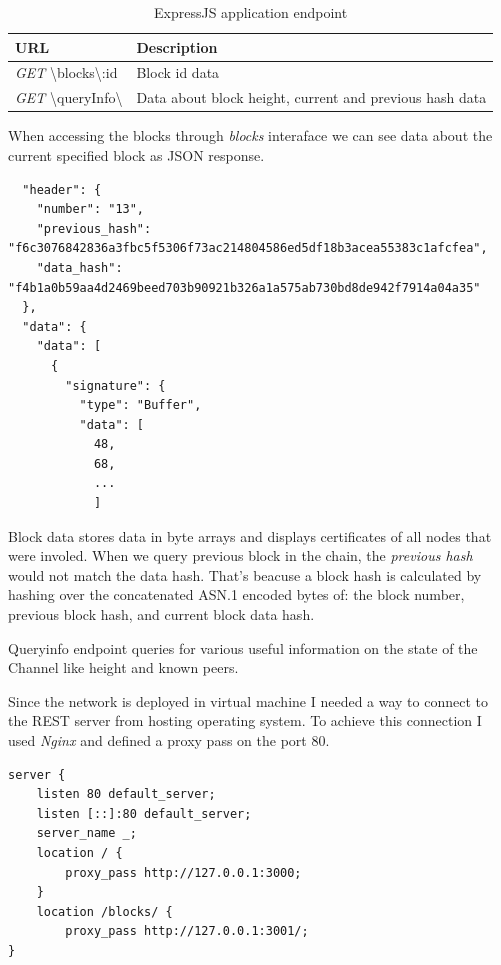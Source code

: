 \begin{table}[H]
\centering
\caption{ExpressJS application endpoint}
\begin{tabular}{|l|l|}
\hline
\textbf{URL}       & \textbf{Description}                                                                                                                         \\ \hline
\emph{GET} \textbackslash{blocks}\textbackslash{:id}             & Block {id} data                                                                                              \\ \hline
\emph{GET}  \textbackslash{queryInfo}\textbackslash             & Data about block height, current and previous hash data   \\ \hline

\end{tabular}
\end{table}

When accessing the blocks through \emph{blocks} interaface we can see data about the current specified block as JSON response. 

\begin{lstlisting}
  "header": {
    "number": "13",
    "previous_hash": "f6c3076842836a3fbc5f5306f73ac214804586ed5df18b3acea55383c1afcfea",
    "data_hash": "f4b1a0b59aa4d2469beed703b90921b326a1a575ab730bd8de942f7914a04a35"
  },
  "data": {
    "data": [
      {
        "signature": {
          "type": "Buffer",
          "data": [
            48,
            68,
            ...
            ]
\end{lstlisting}

Block data stores data in byte arrays and displays certificates of all nodes that were involed. When we query previous block in the chain, the \emph{previous   hash} would not match the data hash. That's beacuse a block hash is calculated by hashing over the concatenated ASN.1 encoded bytes of: the block number, previous block hash, and current block data hash.

Queryinfo endpoint queries for various useful information on the state of the Channel like height and known peers.  

Since the network is deployed in virtual machine I needed a way to connect to the REST server from hosting operating system. To achieve this connection I used \emph{Nginx} and defined a proxy pass on the port 80.

\begin{lstlisting}
server {
	listen 80 default_server;
	listen [::]:80 default_server;
	server_name _;
	location / {
		proxy_pass http://127.0.0.1:3000;
	}
	location /blocks/ {
		proxy_pass http://127.0.0.1:3001/;
}
\end{lstlisting}

